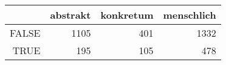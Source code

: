 \begin{tabular}{rrrr}
  \hline
 & abstrakt & konkretum & menschlich \\ 
  \hline
FALSE & 1105 & 401 & 1332 \\ 
  TRUE & 195 & 105 & 478 \\ 
   \hline
\end{tabular}
